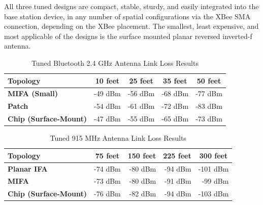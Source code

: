 \documentclass[journal,compsoc]{IEEEtran}
\begin{document}
All three tuned designs are compact, stable, sturdy, and easily integrated into the base station device, in any number of spatial configurations via the XBee SMA connection, depending on the XBee placement.  The smallest, least expensive, and most applicable of the designs is the surface mounted planar reversed inverted-f antenna.


\begin{table}[t]
  \centering
  \begin{tabular}{>{\bfseries}l|l l l l}
  \hline
    Topology & \multicolumn{1}{|c|}{10 feet} & \multicolumn{1}{|c|}{25 feet} & \multicolumn{1}{|c|}{35 feet} & \multicolumn{1}{|c|}{50 feet} \\
    \hline
    MIFA (Small) & \multicolumn{1}{|r|}{-49 dBm} & \multicolumn{1}{|r|}{-56 dBm} & \multicolumn{1}{|r|}{-68 dBm} & \multicolumn{1}{|r|}{-77 dBm} \\
    Patch & \multicolumn{1}{|r|}{-54 dBm} & \multicolumn{1}{|r|}{-61 dBm} & \multicolumn{1}{|r|}{-72 dBm} & \multicolumn{1}{|r|}{-83 dBm} \\
    Chip (Surface-Mount) & \multicolumn{1}{|r|}{-47 dBm} & \multicolumn{1}{|r|}{-55 dBm} & \multicolumn{1}{|r|}{-65 dBm} & \multicolumn{1}{|r|}{-73 dBm} \\ \hline
  \end{tabular} \newline
  \caption{Tuned Bluetooth 2.4 GHz Antenna Link Loss Results}
\end{table}

\begin{table}[t]
  \centering
  \begin{tabular}{>{\bfseries}l|l l l l}
  \hline
    Topology & \multicolumn{1}{|c|}{75 feet} & \multicolumn{1}{|c|}{150 feet} & \multicolumn{1}{|c|}{225 feet} & \multicolumn{1}{|c|}{300 feet} \\
    \hline
    Planar IFA & \multicolumn{1}{|r|}{-74 dBm} & \multicolumn{1}{|r|}{-80 dBm} & \multicolumn{1}{|r|}{-94 dBm} & \multicolumn{1}{|r|}{-101 dBm} \\
    MIFA & \multicolumn{1}{|r|}{-73 dBm} & \multicolumn{1}{|r|}{-80 dBm} & \multicolumn{1}{|r|}{-91 dBm} & \multicolumn{1}{|r|}{-99 dBm} \\
    Chip (Surface-Mount) & \multicolumn{1}{|r|}{-76 dBm} & \multicolumn{1}{|r|}{-82 dBm} & \multicolumn{1}{|r|}{-94 dBm} & \multicolumn{1}{|r|}{-103 dBm} \\ \hline
  \end{tabular} \newline
  \caption{Tuned 915 MHz Antenna Link Loss Results}
\end{table}
\end{document}
